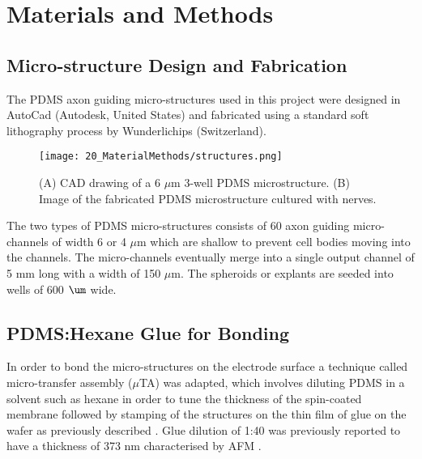 \documentclass{book}
\begin{document}
    

\chapter{Materials and Methods}
\label{ch:MatMet}

\section{Micro-structure Design and Fabrication}

The PDMS axon guiding micro-structures used in this project were designed in AutoCad (Autodesk, United States) and fabricated using a standard soft lithography process by Wunderlichips (Switzerland).

\begin{figure}[H]
\centering
\texttt{[image: 20\_MaterialMethods/structures.png]}
\caption{(A) CAD drawing of a 6 $\mu$m 3-well PDMS microstructure. (B) Image of the fabricated PDMS microstructure cultured with nerves. }
\label{fig:microstructure}
\end{figure}

The two types of PDMS micro-structures consists of 60 axon guiding micro-channels of width 6 or 4 $\mu$m which are shallow to prevent cell bodies moving into the channels. The micro-channels eventually merge into a single output channel of 5 mm long with a width of 150 $\mu$m. The spheroids or explants are seeded into wells of 600 $\um$ wide. 

\section{PDMS:Hexane Glue for Bonding}
In order to bond the micro-structures on the electrode surface a technique called micro-transfer assembly ($\mu$TA) was adapted, which involves diluting PDMS in a solvent such as hexane in order to tune the thickness of the spin-coated membrane followed by stamping of the structures on the thin film of glue on the wafer as previously described \cite{yang2019microfluidic} \cite{thangawng2007ultra}. Glue dilution of 1:40 was previously reported to have a thickness of 373 nm characterised by AFM \cite{ryoo2011ultrathin}.
\end{document}
